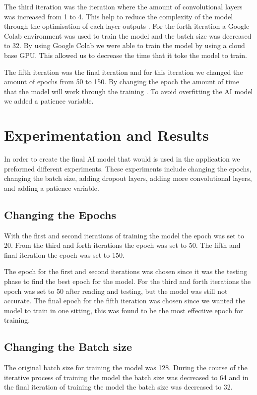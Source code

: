 \documentclass[conference]{IEEEtran}
\begin{document}
The third iteration was the iteration where the amount of convolutional layers was increased from 1 to 4. This help to reduce the complexity of the model through the optimisation of each layer outputs \cite{b3}. For the forth iteration a Google Colab environment was used to train the model and the batch size was decreased to 32. By using Google Colab we were able to train the model by using a cloud base GPU. This allowed us to decrease the time that it toke the model to train.

The fifth iteration was the final iteration and for this iteration we changed the amount of epochs from 50 to 150. By changing the epoch the amount of time that the model will work through the training \cite{b4}. To avoid overfitting the AI model we added a patience variable.

\section{Experimentation and Results}

In order to create the final AI model that would is used in the application we preformed different experiments. These experiments include changing the epochs, changing the batch size, adding dropout layers, adding more convolutional layers, and adding a patience variable.

\subsection{Changing the Epochs}

With the first and second iterations of training the model the epoch was set to 20. From the third and forth iterations the epoch was set to 50. The fifth and final iteration the epoch was set to 150.

The epoch for the first and second iterations was chosen since it was the testing phase to find the best epoch for the model. For the third and forth iterations the epoch was set to 50 after reading \cite{b4} and testing, but the model was still not accurate. The final epoch for the fifth iteration was chosen since we wanted the model to train in one sitting, this was found to be the most effective epoch for training.

\subsection{Changing the Batch size}

The original batch size for training the model was 128. During the course of the iterative process of training the model the batch size was decreased to 64 and in the final iteration of training the model the batch size was decreased to 32.
\end{document}
